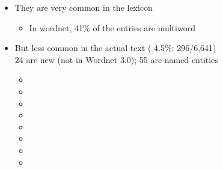 \documentclass[a4paper,landscape,headrule,footrule,xetex]{foils}
\begin{document}


\begin{itemize}
\item They are very common in the lexicon
  \begin{itemize}
  \item In wordnet,  41\% of the entries are multiword %
  \end{itemize}
\item But less common in the actual text ( 4.5\%: 296/6,641)
\\ 24 are new (not in Wordnet 3.0); 55 are named entities




  \begin{itemize}
  \item {}
  \item {}
  \item {}
  \item {}
  \item {}
  \item {}
  \item {}
  \item {} 
  \end{itemize}
\end{itemize}
\end{document}
